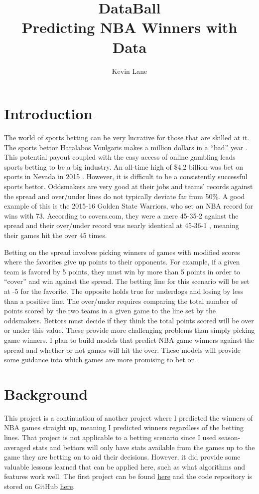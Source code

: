 \documentclass{article}
\title{DataBall \\ Predicting NBA Winners with Data}
\author{Kevin Lane}
\begin{document}
\maketitle

\section{Introduction}

The world of sports betting can be very lucrative for those that are skilled at it. The sports bettor Haralabos Voulgaris makes a million dollars in a ``bad'' year \cite{silver}. This potential payout coupled with the easy access of online gambling leads sports betting to be a big industry. An all-time high of \$4.2 billion was bet on sports in Nevada in 2015 \cite{espn}. However, it is difficult to be a consistently successful sports bettor. Oddsmakers are very good at their jobs and teams' records against the spread and over/under lines do not typically deviate far from 50\%. A good example of this is the 2015-16 Golden State Warriors, who set an NBA record for wins with 73. According to covers.com, they were a mere 45-35-2 against the spread and their over/under record was nearly identical at 45-36-1 \cite{covers}, meaning their games hit the over 45 times.

Betting on the spread involves picking winners of games with modified scores where the favorites give up points to their opponents. For example, if a given team is favored by 5 points, they must win by more than 5 points in order to ``cover'' and win against the spread. The betting line for this scenario will be set at -5 for the favorite. The opposite holds true for underdogs and losing by less than a positive line. The over/under requires comparing the total number of points scored by the two teams in a given game to the line set by the oddsmakers. Bettors must decide if they think the total points scored will be over or under this value. These provide more challenging problems than simply picking game winners. I plan to build models that predict NBA game winners against the spread and whether or not games will hit the over. These models will provide some guidance into which games are more promising to bet on.

\section{Background}

This project is a continuation of another project where I predicted the winners of NBA games straight up, meaning I predicted winners regardless of the betting lines. That project is not applicable to a betting scenario since I used season-averaged stats and bettors will only have stats available from the games up to the game they are betting on to aid their decisions. However, it did provide some valuable lessons learned that can be applied here, such as what algorithms and features work well. The first project can be found \href{https://klane.github.io/databall1/}{here} and the code repository is stored on GitHub \href{https://github.com/klane/databall1}{here}.
\end{document}

